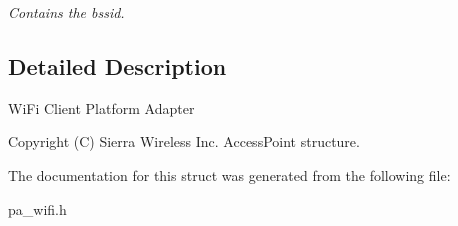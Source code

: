 \begin{DoxyCompactItemize}
\begin{DoxyCompactList}\small\item\em Contains the bssid. \end{DoxyCompactList}\end{DoxyCompactItemize}


\subsection{Detailed Description}
Wi\+Fi Client Platform Adapter

Copyright (C) Sierra Wireless Inc. Access\+Point structure. 

The documentation for this struct was generated from the following file\+:\begin{DoxyCompactItemize}
\item 
pa\+\_\+wifi.\+h\end{DoxyCompactItemize}
